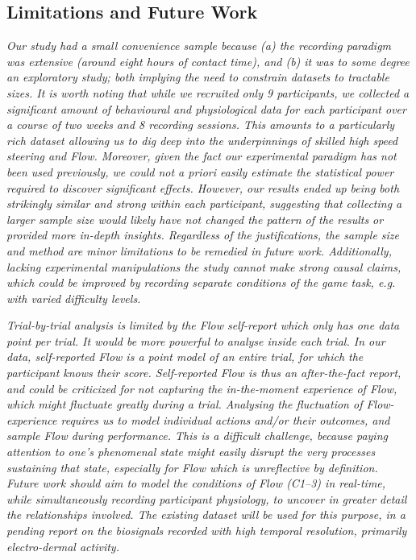 \documentclass[a4paper,doc,floatsintext,natbib,10pt]{apa6}
\begin{document}
\subsection*{Limitations and Future Work}
{\it Our study had a small convenience sample because (a) the recording paradigm was extensive (around eight hours of contact time), and (b) it was to some degree an exploratory study; both implying the need to constrain datasets to tractable sizes. It is worth noting that while we recruited only 9 participants, we collected a significant amount of behavioural and physiological data for each participant over a course of two weeks and 8 recording sessions. This amounts to a particularly rich dataset allowing us to dig deep into the underpinnings of skilled high speed steering and Flow. Moreover, given the fact our experimental paradigm has not been used previously, we could not {\it a priori} easily estimate the statistical power required to discover significant effects. However, our results ended up being both strikingly {\it similar} and {\it strong} within each participant, suggesting that collecting a larger sample size would likely have {\it not} changed the pattern of the results or provided more in-depth insights. Regardless of the justifications, the sample size and method are minor limitations to be remedied in future work. Additionally, lacking experimental manipulations the study cannot make strong causal claims, which could be improved by recording separate conditions of the game task, e.g. with varied difficulty levels.}

{\it Trial-by-trial analysis is limited by the Flow self-report which only has one data point per trial. It would be more powerful to analyse {\it inside} each trial. In our data, self-reported Flow is a point model of an entire trial, for which the participant knows their score. Self-reported Flow is thus an after-the-fact report, and could be criticized for not capturing the in-the-moment {\it experience of Flow}, which might fluctuate greatly during a trial. Analysing the fluctuation of Flow-experience requires us to model individual actions and/or their outcomes, and sample Flow during performance. This is a difficult challenge, because paying attention to one's phenomenal state might easily disrupt the very processes sustaining that state, especially for Flow which is unreflective by definition. Future work should aim to model the conditions of Flow ({\sf C1--3}) in real-time, while simultaneously recording participant physiology, to uncover in greater detail the relationships involved. The existing dataset will be used for this purpose, in a pending report on the biosignals recorded with high temporal resolution, primarily electro-dermal activity.}
\end{document}
